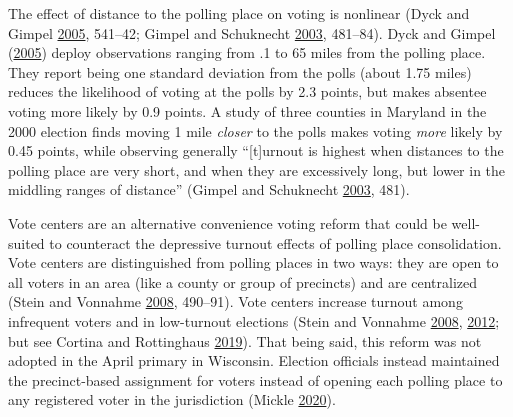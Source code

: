 \documentclass[
  12pt,
]{article}
\begin{document}
The effect of distance to the polling place on voting is nonlinear (Dyck and Gimpel \protect\hyperlink{ref-Dyck2005}{2005}, 541--42; Gimpel and Schuknecht \protect\hyperlink{ref-Gimpel2003}{2003}, 481--84). Dyck and Gimpel (\protect\hyperlink{ref-Dyck2005}{2005}) deploy observations ranging from .1 to 65 miles from the polling place. They report being one standard deviation from the polls (about 1.75 miles) reduces the likelihood of voting at the polls by 2.3 points, but makes absentee voting more likely by 0.9 points. A study of three counties in Maryland in the 2000 election finds moving 1 mile \emph{closer} to the polls makes voting \emph{more} likely by 0.45 points, while observing generally ``{[}t{]}urnout is highest when distances to the polling place are very short, and when they are excessively long, but lower in the middling ranges of distance'' (Gimpel and Schuknecht \protect\hyperlink{ref-Gimpel2003}{2003}, 481).

Vote centers are an alternative convenience voting reform that could be well-suited to counteract the depressive turnout effects of polling place consolidation. Vote centers are distinguished from polling places in two ways: they are open to all voters in an area (like a county or group of precincts) and are centralized (Stein and Vonnahme \protect\hyperlink{ref-Stein2008}{2008}, 490--91). Vote centers increase turnout among infrequent voters and in low-turnout elections (Stein and Vonnahme \protect\hyperlink{ref-Stein2008}{2008}, \protect\hyperlink{ref-Stein2012}{2012}; but see Cortina and Rottinghaus \protect\hyperlink{ref-Cortina2019}{2019}). That being said, this reform was not adopted in the April primary in Wisconsin. Election officials instead maintained the precinct-based assignment for voters instead of opening each polling place to any registered voter in the jurisdiction (Mickle \protect\hyperlink{ref-Mickle2020}{2020}).
\end{document}
